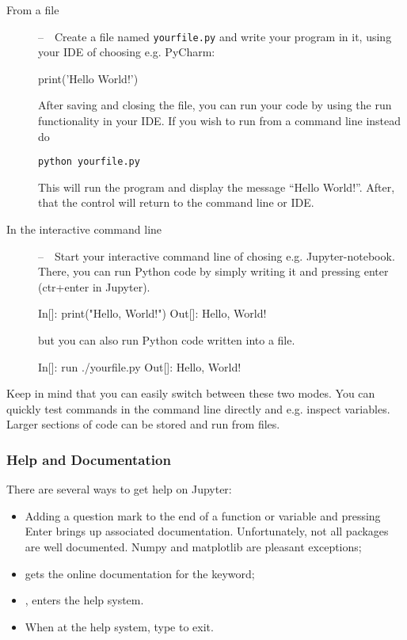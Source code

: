 \begin{description}
\item[From a file]--~~Create a file named \texttt{yourfile.py} and write your 
program in it, using your IDE of choosing e.g. PyCharm:

\begin{python}
print('Hello World!')
\end{python}

After saving and closing the file, you can run your code by using the run
functionality in your IDE. If you wish to run from a command line instead do

\begin{verbatim}
python yourfile.py
\end{verbatim}

This will run the program and display the message ``Hello World!''. After, 
that the control will return to the command line or IDE.


\item[In the interactive command line]--~~Start your interactive command line of
chosing e.g. Jupyter-notebook. There, you can run Python code
by simply writing it and pressing enter (ctr+enter in Jupyter).

\begin{python}
 In[]: print("Hello, World!")
Out[]: Hello, World!
\end{python}

but you can also run Python code written into a file.

\begin{python}
 In[]: run ./yourfile.py
Out[]: Hello, World!
\end{python}
\end{description}

Keep in mind that you can easily switch between these two modes. You can
quickly test commands in the command line directly and e.g. inspect variables.
Larger sections of code can be stored and run from files.

\subsubsection{Help and Documentation}

There are several ways to get help on Jupyter:

\begin{itemize}
\item Adding a question mark to the end of a function or variable and pressing
Enter brings up associated documentation. Unfortunately, not all packages are
well documented. Numpy and matplotlib are pleasant exceptions;
\item {} gets the online documentation for the  keyword;
\item {}, enters the help system.
\item When at the help system, type  to exit.
\end{itemize}

